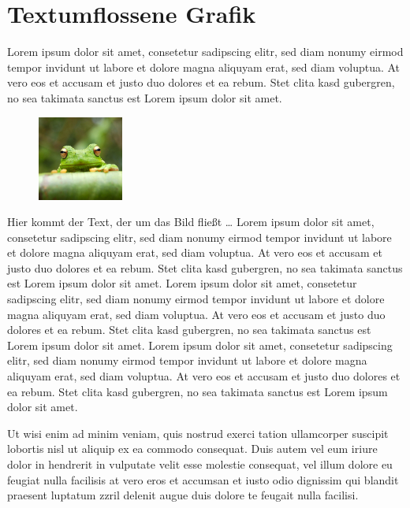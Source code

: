 \documentclass[11pt]{scrartcl}
\begin{document}
\newpage

\section{Textumflossene Grafik}

Lorem ipsum dolor sit amet, consetetur sadipscing elitr, sed diam nonumy eirmod tempor invidunt ut labore et dolore magna aliquyam erat, sed diam voluptua. At vero eos et accusam et justo duo dolores et ea rebum. Stet clita kasd gubergren, no sea takimata sanctus est Lorem ipsum dolor sit amet.

\begin{figure}
 \vspace{-16pt}
 \centering 
 \includegraphics[width=0.25\textwidth]{frog}
 \label{fig:meine-Grafik}
 \vspace{-10pt}
\end{figure}
Hier kommt der Text, der um das Bild fließt \ldots 
Lorem ipsum dolor sit amet, consetetur sadipscing elitr, sed diam nonumy eirmod tempor invidunt ut labore et dolore magna aliquyam erat, sed diam voluptua. At vero eos et accusam et justo duo dolores et ea rebum. Stet clita kasd gubergren, no sea takimata sanctus est Lorem ipsum dolor sit amet. Lorem ipsum dolor sit amet, consetetur sadipscing elitr, sed diam nonumy eirmod tempor invidunt ut labore et dolore magna aliquyam erat, sed diam voluptua. At vero eos et accusam et justo duo dolores et ea rebum. Stet clita kasd gubergren, no sea takimata sanctus est Lorem ipsum dolor sit amet. Lorem ipsum dolor sit amet, consetetur sadipscing elitr, sed diam nonumy eirmod tempor invidunt ut labore et dolore magna aliquyam erat, sed diam voluptua. At vero eos et accusam et justo duo dolores et ea rebum. Stet clita kasd gubergren, no sea takimata sanctus est Lorem ipsum dolor sit amet.

Ut wisi enim ad minim veniam, quis nostrud exerci tation ullamcorper suscipit lobortis nisl ut aliquip ex ea commodo consequat. Duis autem vel eum iriure dolor in hendrerit in vulputate velit esse molestie consequat, vel illum dolore eu feugiat nulla facilisis at vero eros et accumsan et iusto odio dignissim qui blandit praesent luptatum zzril delenit augue duis dolore te feugait nulla facilisi.   
\end{document}

